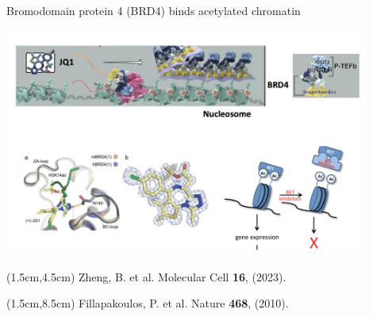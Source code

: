 \documentclass{beamer}					%
\begin{document}
\begin{frame}{Bromodomain protein 4 (BRD4) binds acetylated chromatin}

\includegraphics[width=12cm]{../../dissertation/dissertation/media/Epigenetic}

\begin{textblock*}{10cm}(1.5cm,4.5cm)
Zheng, B. et al. Molecular Cell \textbf{16}, (2023).
\end{textblock*}

\begin{textblock*}{10cm}(1.5cm,8.5cm)
Fillapakoulos, P. et al. Nature \textbf{468}, (2010).
\end{textblock*}

\end{frame}

\end{document}
